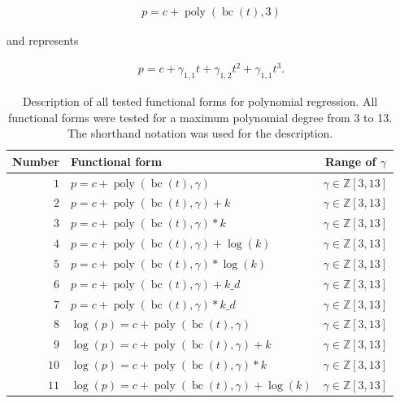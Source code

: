 \documentclass[12pt,a4paper]{article}
\DeclareMathOperator{\bc}{bc}
\DeclareMathOperator{\poly}{poly}
\begin{document}
\begin{align}
    p = c + \poly\left( \bc(t), 3 \right)
\end{align}

and represents

\begin{align}
    p = c + \gamma_{1,1} t + \gamma_{1,2} t^2 + \gamma_{1,1} t^3 .
\end{align}

\begin{table}
    \centering
    \caption{Description of all tested functional forms for polynomial regression. All functional forms were tested for a maximum polynomial degree from 3 to 13. The shorthand notation was used for the description.}
    \label{tab:func_form}    
    \begin{tabular}{rlc}
        Number & Functional form & Range of $\gamma$ \\
        \toprule
        $1$ & $p = c + \poly\left( \bc(t), \gamma \right) $ & $\gamma \in \mathbb{Z} \left[3, 13 \right]$\\ 
        $2$ & $p = c + \poly\left( \bc(t), \gamma \right) + k $ & $\gamma \in \mathbb{Z} \left[3, 13 \right]$\\
        $3$ & $p = c + \poly\left( \bc(t), \gamma \right) * k $ & $\gamma \in \mathbb{Z} \left[3, 13 \right]$\\
        $4$ & $p = c + \poly\left( \bc(t), \gamma \right) + \log(k) $ & $\gamma \in \mathbb{Z} \left[3, 13 \right]$\\
        $5$ & $p = c + \poly\left( \bc(t), \gamma \right) * \log(k) $ & $\gamma \in \mathbb{Z} \left[3, 13 \right]$\\
        $6$ & $p = c + \poly\left( \bc(t), \gamma \right) + k\_d $ & $\gamma \in \mathbb{Z} \left[3, 13 \right]$\\
        $7$ & $p = c + \poly\left( \bc(t), \gamma \right) * k\_d $ & $\gamma \in \mathbb{Z} \left[3, 13 \right]$\\ %
        \midrule
        $8$ & $\log(p) = c + \poly\left( \bc(t), \gamma \right) $ & $\gamma \in \mathbb{Z} \left[3, 13 \right]$\\ 
        $9$ & $\log(p) = c + \poly\left( \bc(t), \gamma \right) + k $ & $\gamma \in \mathbb{Z} \left[3, 13 \right]$\\
        $10$ & $\log(p) = c + \poly\left( \bc(t), \gamma \right) * k $ & $\gamma \in \mathbb{Z} \left[3, 13 \right]$\\
        $11$ & $\log(p) = c + \poly\left( \bc(t), \gamma \right) + \log(k) $ & $\gamma \in \mathbb{Z} \left[3, 13 \right]$\\

\end{tabular}
\end{table}
\end{document}
